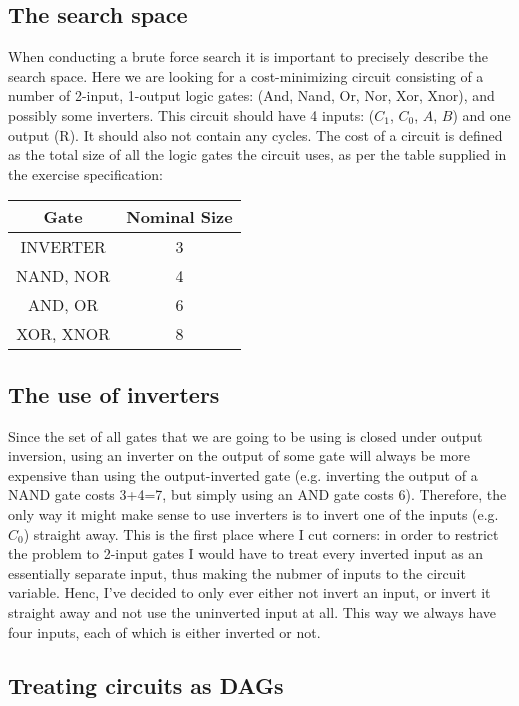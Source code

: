\documentclass[12pt]{article}
\begin{document}
\subsection { The search space }
When conducting a brute force search it is important to precisely describe the search space.
Here we are looking for a cost-minimizing circuit consisting of a number of 2-input, 1-output logic gates:
(And, Nand, Or, Nor, Xor, Xnor), and possibly some inverters. This circuit should have 4 inputs: ($C_1$, $C_0$, $A$, $B$) 
and one output (R). It should also not contain any cycles. The cost of a circuit is defined as the total size of
all the logic gates the circuit uses, as per the table supplied in the exercise specification:

\begin{table}[h]
  \centering
  \begin{tabular}{|c|c|}
  \hline  
  
  Gate & Nominal Size \\
  \hline
  INVERTER & 3 \\
  NAND, NOR & 4 \\
  AND, OR & 6 \\
  XOR, XNOR & 8 \\
  \hline

  \end{tabular}
\end{table}

\subsection {The use of inverters}
Since the set of all gates that we are going to be using is
closed under output inversion, using an inverter on the output of some gate will always be
more expensive than using the output-inverted gate (e.g. inverting the output of a NAND gate costs
3+4=7, but simply using an AND gate costs 6). Therefore, the only way it might make sense to use
inverters is to invert one of the inputs (e.g. $C_0$) straight away. This is the first place where
I cut corners: in order to restrict the problem to 2-input gates I would have to treat every inverted
input as an essentially separate input, thus making the nubmer of inputs to the circuit variable.
Henc, I've decided to only ever either not invert an input, or invert it straight away and not use the
uninverted input at all. This way we always have four inputs, each of which is either inverted or not.

\subsection { Treating circuits as DAGs}
\end{document}
